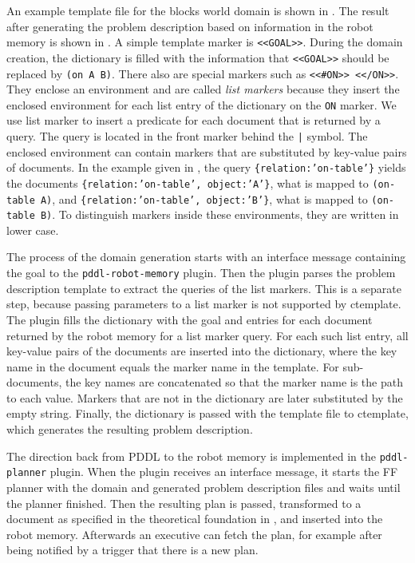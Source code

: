 An example template file for the blocks world domain is shown in
. The result after generating the problem
description based on information in the robot memory is shown in
. A simple template marker is
\texttt{<<GOAL>>}. During the domain creation, the dictionary is
filled with the information that \texttt{<<GOAL>>} should be replaced
by \texttt{(on A B)}. There also are special markers such as
\texttt{<<#ON>> <</ON>>}. They enclose an environment and are called
\emph{list markers} because they insert the enclosed environment for
each list entry of the dictionary on the \texttt{ON} marker. We use
list marker to insert a predicate for each document that is returned
by a query. The query is located in the front marker behind the
\texttt{|} symbol. The enclosed environment can contain markers that
are substituted by key-value pairs of documents. In the example given
in , the query \texttt{\{relation:'on-table'\}}
yields the documents \texttt{\{relation:'on-table', object:'A'\}},
what is mapped to \texttt{(on-table A)}, and
\texttt{\{relation:'on-table', object:'B'\}}, what is mapped to
\texttt{(on-table B)}. To distinguish markers inside these
environments, they are written in lower case.

The process of the domain generation starts with an interface message
containing the goal to the \texttt{pddl-robot-memory} plugin. Then the
plugin parses the problem description template to extract the queries
of the list markers. This is a separate step, because passing
parameters to a list marker is not supported by ctemplate. The plugin
fills the dictionary with the goal and entries for each document
returned by the robot memory for a list marker query. For each such
list entry, all key-value pairs of the documents are inserted into the
dictionary, where the key name in the document equals the marker name
in the template. For sub-documents, the key names are concatenated so
that the marker name is the path to each value. Markers that are not
in the dictionary are later substituted by the empty string. Finally,
the dictionary is passed with the template file to ctemplate, which
generates the resulting problem description.


The direction back from PDDL to the robot memory is implemented in the
\texttt{pddl-planner} plugin. When the plugin receives an interface
message, it starts the FF planner with the domain and generated
problem description files and waits until the planner finished. Then
the resulting plan is passed, transformed to a document as specified
in the theoretical foundation in , and inserted
into the robot memory. Afterwards an executive can fetch the plan, for
example after being notified by a trigger that there is a new plan.

